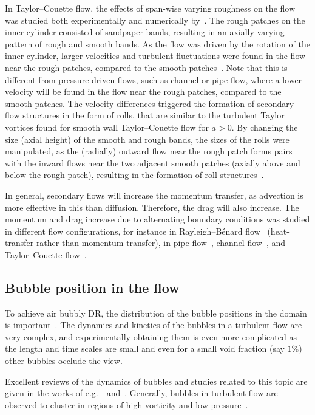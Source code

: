 \documentclass[aps,twocolumn,10pt,floatfix, superscriptaddress,longbibliography,pra]{revtex4-1}
\begin{document}
In Taylor--Couette flow, the effects of span-wise varying roughness on the flow was studied both experimentally and numerically by~\cite{Bakhuis2019}. The rough patches on the inner cylinder consisted of sandpaper bands, resulting in an axially varying pattern of rough and smooth bands. As the flow was driven by the rotation of the inner cylinder, larger velocities and turbulent fluctuations were found in the flow near the rough patches, compared to the smooth patches~\citep{Bakhuis2019}. Note that this is different from pressure driven flows, such as channel or pipe flow, where a lower velocity will be found in the flow near the rough patches, compared to the smooth patches. The velocity differences triggered the formation of secondary flow structures in the form of rolls, that are similar to the turbulent Taylor vortices found for smooth wall Taylor--Couette flow for $a>0$. By changing the size (axial height) of the smooth and rough bands, the sizes of the rolls were manipulated, as the (radially) outward flow near the rough patch forms pairs with the inward flows near the two adjacent smooth patches (axially above and below the rough patch), resulting in the formation of roll structures~\citep{Bakhuis2019}.

In general, secondary flows will increase the momentum transfer, as advection is more effective in this than diffusion. Therefore, the drag will also increase. The momentum and drag increase due to alternating boundary conditions was studied in different flow configurations, for instance in Rayleigh--B\'{e}nard flow~\citep{Bakhuis2018} (heat-transfer rather than momentum transfer), in pipe flow~\citep{Chan2018}, channel flow~\citep{Chung2018}, and Taylor--Couette flow~\citep{vanGils2012}.

\subsection{Bubble position in the flow}
To achieve air bubbly DR, the distribution of the bubble positions in the domain is important~\citep{Fokoua2015}. The dynamics and kinetics of the bubbles in a turbulent flow are very complex, and experimentally obtaining them is even more complicated as the length and time scales are small and even for a small void fraction (say $1\%$) other bubbles occlude the view.

Excellent reviews of the dynamics of bubbles and studies related to this topic are given in the works of e.g.~\cite{Magnaudet2000}~and~\cite{Lohse2018}. Generally, bubbles in turbulent flow are observed to cluster in regions of high vorticity and low pressure~\citep{Mazzitelli2003,Climent2007}.
\end{document}
